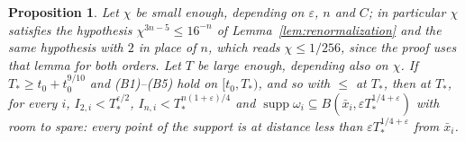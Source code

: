 \documentclass[11pt]{article}
\newtheorem{proposition}{Proposition}
\theoremstyle{definition}
\begin{document}
\begin{proposition}\label{prop:longtime}
Let $\chi$ be small enough, depending on $\varepsilon$, $n$ and $C$; in particular $\chi$ satisfies the hypothesis $\chi^{3n-5} \le 16^{-n}$ of Lemma~\ref{lem:renormalization} and the same hypothesis with $2$ in place of $n$, which reads $\chi \le 1/256$, since the proof uses that lemma for both orders. Let $T$ be large enough, depending also on $\chi$. If $T_* \ge t_0 + t_0^{9/10}$ and (B1)--(B5) hold on $[t_0, T_*)$, and so with $\le$ at $T_*$, then at $T_*$, for every $i$, $I_{2,i} < T_*^{\varepsilon/2}$, $I_{n,i} < T_*^{n(1+\varepsilon)/4}$ and $\operatorname{supp}\omega_i \subseteq B(\bar x_i, \varepsilon T_*^{1/4+\varepsilon})$ with room to spare: every point of the support is at distance less than $\varepsilon T_*^{1/4+\varepsilon}$ from $\bar x_i$.
\end{proposition}
\end{document}
